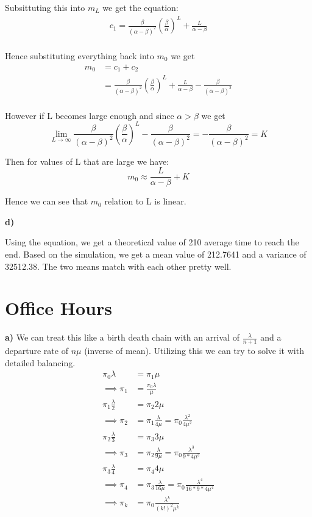 \documentclass{article}
\begin{document}
Subsittuting this into $m_{L}$ we get the equation:
\begin{align}
c_{1} = \frac{\beta}{(\alpha-\beta)^{2}}\left(\frac{\beta}{\alpha}\right)^{L} + \frac{L}{\alpha-\beta}\\
\end{align}

Hence substituting everything back into $m_{0}$ we get
\begin{align}
m_{0} &= c_{1} + c_{2}\\
&= \frac{\beta}{(\alpha-\beta)^{2}}\left(\frac{\beta}{\alpha}\right)^{L} + \frac{L}{\alpha-\beta} - \frac{\beta}{(\alpha-\beta)^{2}}\\
\end{align}

However if L becomes large enough and since $\alpha > \beta$ we get
\[
\lim_{L \to \infty} \frac{\beta}{(\alpha-\beta)^{2}}\left(\frac{\beta}{\alpha}\right)^{L} - \frac{\beta}{(\alpha-\beta)^{2}} = - \frac{\beta}{(\alpha-\beta)^{2}} = K
\]

Then for values of L that are large we have:
\[
m_{0} \approx \frac{L}{\alpha-\beta} + K
\]

Hence we can see that $m_{0}$ relation to L is linear.

\textbf{d)}

Using the equation, we get a theoretical value of 210 average time to reach the end.
Based on the simulation, we get a mean value of 212.7641 and a variance of
32512.38. The two means match with each other pretty well.

\section{Office Hours}

\textbf{a)} We can treat this like a birth death chain with an arrival of $\frac{\lambda}{n+1}$
and a departure rate of $n\mu$ (inverse of mean). Utilizing this we can try to solve it with detailed 
balancing.
\begin{align}
\pi_{0}\lambda &=\pi_{1}\mu\\
\implies \pi_{1} &= \frac{\pi_{0}\lambda}{\mu}\\
\pi_{1}\frac{\lambda}{2} &= \pi_{2}2\mu\\
\implies \pi_{2} &= \pi_{1} \frac{\lambda}{4\mu} = \pi_{0}\frac{\lambda^{2}}{4\mu^{2}}\\
\pi_{2}\frac{\lambda}{3} &= \pi_{3}3\mu\\
\implies \pi_{3} &= \pi_{2} \frac{\lambda}{9\mu} = \pi_{0}\frac{\lambda^{3}}{9*4\mu^{3}}\\
\pi_{3}\frac{\lambda}{4} &= \pi_{4}4\mu\\
\implies \pi_{4} &= \pi_{3} \frac{\lambda}{16\mu} = \pi_{0}\frac{\lambda^{4}}{16*9*4\mu^{4}}\\
\implies \pi_{k} &= \pi_{0}\frac{\lambda^{k}}{(k!)^{2}\mu^{k}}
\end{align}
\end{document}
